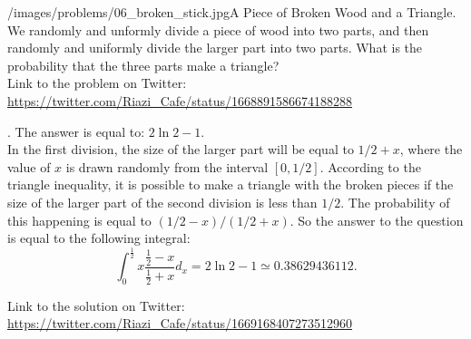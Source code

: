 \begin{problem}{/images/problems/06_broken_stick.jpg}{A Piece of Broken Wood and a Triangle}.
We randomly and unformly divide a piece of wood into two parts, and then randomly and uniformly  divide the larger part into two parts. What is the probability that the three parts make a triangle?\\[0.2cm]

Link to the problem on Twitter:  \url{https://twitter.com/Riazi_Cafe/status/1668891586674188288}
\end{problem}
\begin{solution}.
The answer is equal to: $2 \ln 2 - 1$.\\[0.2cm]

In the first division, the size of the larger part will be equal to $1/2 + x$, where the value of $x$ is drawn randomly from the interval $[0,1/2]$. According to the triangle inequality, it is possible to make a triangle with the broken pieces if the size of the larger part of the second division is less than $1/2$. The probability of this happening is equal to $(1/2 - x)/(1/2+x)$. So the answer to the question is equal to the following integral:
$$\int_{0}^{\frac{1}{2}} x \frac{\frac{1}{2} - x}{\frac{1}{2} + x} d_x  = 2\ln 2-1 \simeq 0.38629436112.$$



Link to the solution on Twitter:  \url{https://twitter.com/Riazi_Cafe/status/1669168407273512960}
\end{solution}